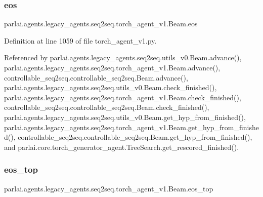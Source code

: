 \subsubsection{\texorpdfstring{eos}{eos}}
{\footnotesize\ttfamily parlai.\+agents.\+legacy\+\_\+agents.\+seq2seq.\+torch\+\_\+agent\+\_\+v1.\+Beam.\+eos}



Definition at line 1059 of file torch\+\_\+agent\+\_\+v1.\+py.



Referenced by parlai.\+agents.\+legacy\+\_\+agents.\+seq2seq.\+utils\+\_\+v0.\+Beam.\+advance(), parlai.\+agents.\+legacy\+\_\+agents.\+seq2seq.\+torch\+\_\+agent\+\_\+v1.\+Beam.\+advance(), controllable\+\_\+seq2seq.\+controllable\+\_\+seq2seq.\+Beam.\+advance(), parlai.\+agents.\+legacy\+\_\+agents.\+seq2seq.\+utils\+\_\+v0.\+Beam.\+check\+\_\+finished(), parlai.\+agents.\+legacy\+\_\+agents.\+seq2seq.\+torch\+\_\+agent\+\_\+v1.\+Beam.\+check\+\_\+finished(), controllable\+\_\+seq2seq.\+controllable\+\_\+seq2seq.\+Beam.\+check\+\_\+finished(), parlai.\+agents.\+legacy\+\_\+agents.\+seq2seq.\+utils\+\_\+v0.\+Beam.\+get\+\_\+hyp\+\_\+from\+\_\+finished(), parlai.\+agents.\+legacy\+\_\+agents.\+seq2seq.\+torch\+\_\+agent\+\_\+v1.\+Beam.\+get\+\_\+hyp\+\_\+from\+\_\+finished(), controllable\+\_\+seq2seq.\+controllable\+\_\+seq2seq.\+Beam.\+get\+\_\+hyp\+\_\+from\+\_\+finished(), and parlai.\+core.\+torch\+\_\+generator\+\_\+agent.\+Tree\+Search.\+get\+\_\+rescored\+\_\+finished().

\mbox{\label{classparlai_1_1agents_1_1legacy__agents_1_1seq2seq_1_1torch__agent__v1_1_1Beam_ab9e04c7385dd553a6a8a8c76650d60b7}} 
\subsubsection{\texorpdfstring{eos\+\_\+top}{eos\_top}}
{\footnotesize\ttfamily parlai.\+agents.\+legacy\+\_\+agents.\+seq2seq.\+torch\+\_\+agent\+\_\+v1.\+Beam.\+eos\+\_\+top}



